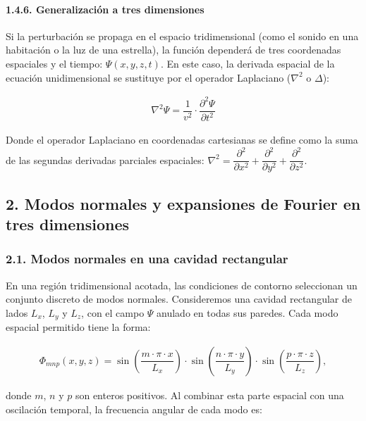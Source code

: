 \documentclass[
  spanish,
]{article}
\begin{document}
\paragraph{1.4.6. Generalización a tres
dimensiones}\label{generalizaciuxf3n-a-tres-dimensiones}

Si la perturbación se propaga en el espacio tridimensional (como el
sonido en una habitación o la luz de una estrella), la función dependerá
de tres coordenadas espaciales y el tiempo: \(\Psi(x,y,z,t)\). En este
caso, la derivada espacial de la ecuación unidimensional se sustituye
por el operador Laplaciano (\(\nabla^2\) o \(\Delta\)):

\[
\begin{aligned}
\nabla^2 \Psi = \dfrac{1}{v^2} \cdot \dfrac{\partial^2 \Psi}{\partial t^2}
\end{aligned}
\]

Donde el operador Laplaciano en coordenadas cartesianas se define como
la suma de las segundas derivadas parciales espaciales:
\(\nabla^2 = \dfrac{\partial^2}{\partial x^2} + \dfrac{\partial^2}{\partial y^2} + \dfrac{\partial^2}{\partial z^2}\).

\subsection{2. Modos normales y expansiones de Fourier en tres
dimensiones}\label{modos-normales-y-expansiones-de-fourier-en-tres-dimensiones}

\subsubsection{2.1. Modos normales en una cavidad
rectangular}\label{modos-normales-en-una-cavidad-rectangular}

En una región tridimensional acotada, las condiciones de contorno
seleccionan un conjunto discreto de modos normales. Consideremos una
cavidad rectangular de lados \(L_x\), \(L_y\) y \(L_z\), con el campo
\(\Psi\) anulado en todas sus paredes. Cada modo espacial permitido
tiene la forma:

\[
\begin{aligned}
\Phi_{mnp}(x,y,z)
= \sin\left(\dfrac{m \cdot \pi \cdot x}{L_x}\right)
\cdot \sin\left(\dfrac{n \cdot \pi \cdot y}{L_y}\right)
\cdot \sin\left(\dfrac{p \cdot \pi \cdot z}{L_z}\right),
\end{aligned}
\]

donde \(m\), \(n\) y \(p\) son enteros positivos. Al combinar esta parte
espacial con una oscilación temporal, la frecuencia angular de cada modo
es:
\end{document}
